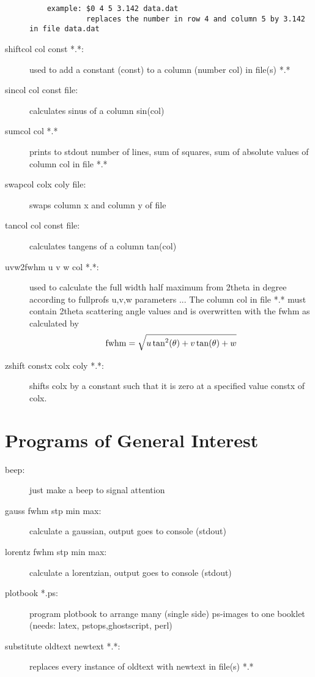 \begin{description}
\begin{verbatim}
    example: $0 4 5 3.142 data.dat
             replaces the number in row 4 and column 5 by 3.142 in file data.dat
\end{verbatim}
\item [\prg shiftcol\index{shiftcol} col const *.*:] used to add a constant (const) to a column %
(number col) in file(s) *.*
\item [\prg sincol\index{sincol} col const file:] calculates sinus of a column sin(col) 
\item [\prg sumcol\index{sumcol} col *.*] prints to stdout number of lines, sum of squares, sum %
of absolute values of column col in file *.*
\item [\prg swapcol\index{swapcol} colx coly file:] swaps column x and column y of file
\item [\prg tancol\index{tanncol} col const file:] calculates tangens of a column tan(col) 
\item [\prg uvw2fwhm\index{uvw2fwhm} u v w col *.*:] used to calculate the full
                   width half maximum from
                   2theta in degree according to fullprofs u,v,w parameters ...
                  The column col in file *.* must contain 2theta scattering angle
                 values and is overwritten with the fwhm as calculated by
                  \begin{equation}
                     {\rm  fwhm }= \sqrt {u \tan^2(\theta) + v \tan(\theta) + w}
                \end{equation}
\item [\prg zshift\index{zshift} constx colx coly *.*:] shifts colx by a constant such that it %
is zero at a specified value constx of colx. 
\end{description}

\section{Programs of General Interest}

\begin{description}
\item [\prg beep:] just make a beep to signal attention 
\item [\prg gauss fwhm stp min max:] calculate a gaussian, output goes to console %
(stdout)
\item [\prg lorentz fwhm stp min max:] calculate a lorentzian, output goes to %
console (stdout)
\item [\prg plotbook *.ps:] program plotbook to arrange many (single side) ps-images to one %
booklet (needs: latex, pstops,ghostscript, perl)
\item [\prg substitute oldtext newtext *.*:] replaces every instance of %
oldtext with newtext in file(s) *.*
\end{description}


